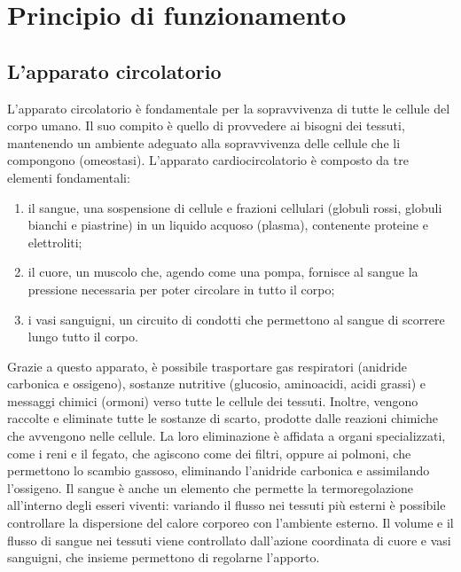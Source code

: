 \section{Principio di funzionamento}
\subsection{L'apparato circolatorio}
L'apparato circolatorio è fondamentale per la sopravvivenza di tutte le cellule del corpo umano. Il suo compito è quello di provvedere ai bisogni dei tessuti, mantenendo un ambiente adeguato alla sopravvivenza delle cellule che li compongono (omeostasi)\cite{Cevese2002}. 
L'apparato cardiocircolatorio è composto da tre elementi fondamentali:
\begin{enumerate}
\item il sangue, una sospensione di cellule e frazioni cellulari (globuli rossi, globuli bianchi e piastrine) in un liquido acquoso (plasma), contenente proteine e elettroliti;
\item il cuore, un muscolo che, agendo come una pompa, fornisce al sangue la pressione necessaria per poter circolare in tutto il corpo;
\item i vasi sanguigni, un circuito di condotti che permettono al sangue di scorrere lungo tutto il corpo.
\end{enumerate}
Grazie a questo apparato, è possibile trasportare gas respiratori (anidride carbonica e ossigeno), sostanze nutritive (glucosio, aminoacidi, acidi grassi) e messaggi chimici (ormoni) verso tutte le cellule dei tessuti. Inoltre, vengono raccolte e eliminate tutte le sostanze di scarto, prodotte  dalle reazioni chimiche che avvengono nelle cellule. La loro eliminazione è affidata a organi specializzati, come i reni e il fegato, che agiscono come dei filtri, oppure ai polmoni, che permettono lo scambio gassoso, eliminando l'anidride carbonica e assimilando l'ossigeno. Il sangue è anche un elemento che permette la termoregolazione all'interno degli esseri viventi: variando il flusso nei tessuti più esterni è possibile controllare la dispersione del calore corporeo con l'ambiente esterno. Il volume e il flusso di sangue nei tessuti viene controllato dall'azione coordinata di cuore e vasi sanguigni, che insieme permettono di regolarne l'apporto.

